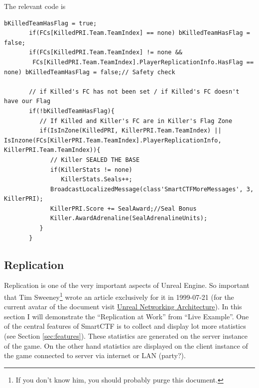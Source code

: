 \documentclass{article}
\begin{document}
The relevant code is
\begin{lstlisting}[frame=single]
  bKilledTeamHasFlag = true;
       if(FCs[KilledPRI.Team.TeamIndex] == none) bKilledTeamHasFlag = false;
       if(FCs[KilledPRI.Team.TeamIndex] != none &&
        FCs[KilledPRI.Team.TeamIndex].PlayerReplicationInfo.HasFlag == none) bKilledTeamHasFlag = false;// Safety check

       // if Killed's FC has not been set / if Killed's FC doesn't have our Flag
       if(!bKilledTeamHasFlag){
          // If Killed and Killer's FC are in Killer's Flag Zone
          if(IsInZone(KilledPRI, KillerPRI.Team.TeamIndex) || IsInzone(FCs[KillerPRI.Team.TeamIndex].PlayerReplicationInfo, KillerPRI.Team.TeamIndex)){
             // Killer SEALED THE BASE
             if(KillerStats != none)
                KillerStats.Seals++;
             BroadcastLocalizedMessage(class'SmartCTFMoreMessages', 3, KillerPRI);
             KillerPRI.Score += SealAward;//Seal Bonus
             Killer.AwardAdrenaline(SealAdrenalineUnits);
          }
       }
\end{lstlisting}

\subsection{Replication}
Replication is one of the very important aspects of Unreal Engine.  So important that Tim Sweeney\footnote{If you don't know him, you should probably purge this document.} wrote an article exclusively for it in 1999-07-21 (for the current avatar of the document visit \href{https://api.unrealengine.com/udk/Three/NetworkingOverview.html}{{\color{Blue}Unreal Networking Architecture}}).  In this section I will demonstrate the ``Replication at Work'' from ``Live Example''.  One of the central features of SmartCTF is to collect and display lot more statistics (see Section \ref{sec:features}).  These statistics are generated on the server instance of the game.  On the other hand statistics are displayed on the client instance of the game connected to server via internet or LAN (party?).
\end{document}
